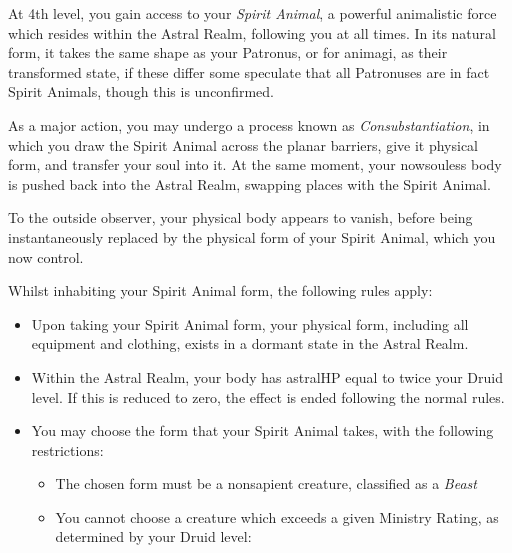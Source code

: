{
	At 4th level, you gain access to your {\it Spirit Animal}, a powerful animalistic force which resides within the Astral Realm, following you at all times. In its natural form, it takes the same shape as your Patronus, or for animagi, as their transformed state, if these differ \minus{} some speculate that all Patronuses are in fact Spirit Animals, though this is unconfirmed. 
	
	As a major action, you may undergo a process known as {\it Consubstantiation}, in which you draw the Spirit Animal across the planar barriers, give it physical form, and transfer your soul into it. At the same moment, your now\minus{}souless body is pushed back into the Astral Realm, swapping places with the Spirit Animal. 

	To the outside observer, your physical body appears to vanish, before being instantaneously replaced by the physical form of your Spirit Animal, which you now control. 
	
	Whilst inhabiting your Spirit Animal form, the following rules apply:
	\begin{itemize}[itemsep = 0cm]
		\item Upon taking your Spirit Animal form, your physical form, including all equipment and clothing, exists in a dormant state in the Astral Realm. 
		\item Within the Astral Realm, your body has astral\minus{}HP equal to twice your Druid level. If this is reduced to zero, the effect is ended following the normal rules.
		\item You may choose the form that your Spirit Animal takes, with the following restrictions: 
			\begin{itemize}[itemsep = 0cm]
				\item The chosen form must be a non\minus{}sapient creature, classified as a {\it Beast}
				\item You cannot choose a creature which exceeds a given Ministry Rating, as determined by your Druid level:
					\begin{center}
						\newcommand\beastEntry[3]{#1	&	#2	&	{ #3} \\}
					

\end{center}
\end{itemize}
\end{itemize}}
